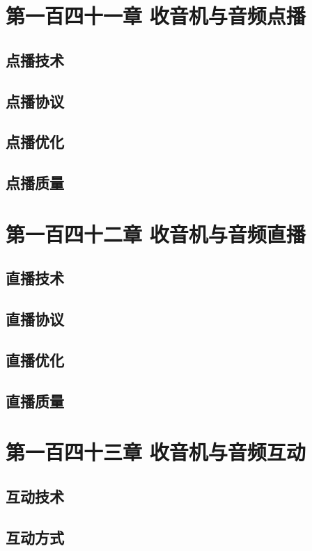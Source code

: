 \documentclass[12pt,UTF8]{ctexbook}
\begin{document}
\chapter{第一百四十一章 收音机与音频点播}

\section{点播技术}
\section{点播协议}
\section{点播优化}
\section{点播质量}

\chapter{第一百四十二章 收音机与音频直播}

\section{直播技术}
\section{直播协议}
\section{直播优化}
\section{直播质量}

\chapter{第一百四十三章 收音机与音频互动}

\section{互动技术}
\section{互动方式}
\end{document}
